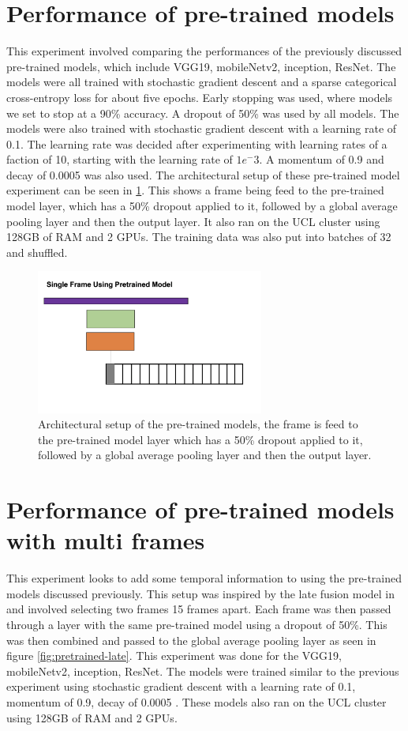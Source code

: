 \section{Performance of pre-trained models}
This experiment involved comparing the performances of the previously discussed pre-trained models, which include VGG19, mobileNetv2, inception, ResNet. The models were all trained with stochastic gradient descent and a sparse categorical cross-entropy loss for about five epochs. Early stopping was used, where models we set to stop at a 90\% accuracy. A dropout of 50\% was used by all models. The models were also trained with stochastic gradient descent with a learning rate of 0.1. The learning rate was decided after experimenting with learning rates of a faction of 10, starting with the learning rate of $1e^-3$. A momentum of 0.9 and decay of 0.0005 was also used. The architectural setup of these pre-trained model experiment can be seen in \ref{fig:pretrained-single}. This shows a frame being feed to the pre-trained model layer, which has a 50\% dropout applied to it, followed by a global average pooling layer and then the output layer. It also ran on the UCL cluster using 128GB of RAM and 2 GPUs. The training data was also put into batches of 32 and shuffled.  

\begin{figure}
    \centering
    \includegraphics[width=75mm,scale=0.5]{pretrained-single.png}
    \caption{Architectural setup of the pre-trained models, the frame is feed to the pre-trained model layer which has a  50\% dropout applied to it, followed by a global average pooling layer and then the output layer. 
}
    \label{fig:pretrained-single}
\end{figure}


\section{Performance of pre-trained models with multi frames}
This experiment looks to add some temporal information to using the pre-trained models discussed previously.  This setup was inspired by the late fusion model in \citep{KarpathyCVPR14} and involved selecting two frames 15 frames apart. Each frame was then passed through a layer with the same pre-trained model using a dropout of 50\%.  This was then combined and passed to the global average pooling layer as seen in figure \ref{fig:pretrained-late}. This experiment was done for the VGG19, mobileNetv2, inception, ResNet. 
The models were trained similar to the previous experiment using stochastic gradient descent with a learning rate of 0.1, momentum of 0.9,  decay of 0.0005 . These models also ran on the UCL cluster using 128GB of RAM and 2 GPUs.

